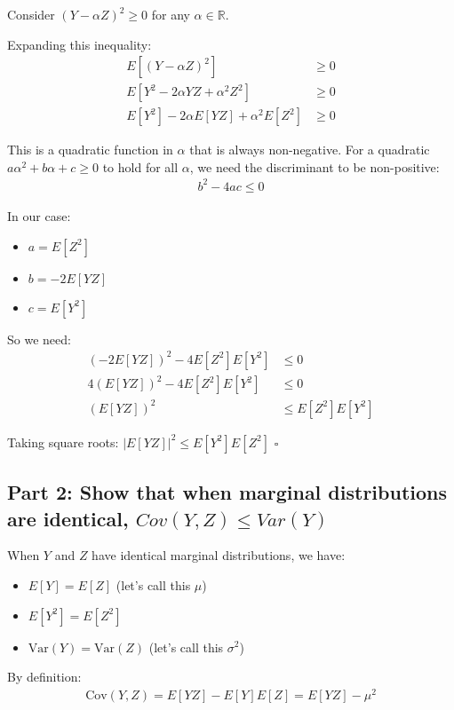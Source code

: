 \documentclass[11pt,a4paper]{article}
\begin{document}
Consider $(Y - \alpha Z)^2 \geq 0$ for any $\alpha \in \mathbb{R}$.

Expanding this inequality:
\begin{align}
E[(Y - \alpha Z)^2] &\geq 0\\
E[Y^2 - 2\alpha YZ + \alpha^2 Z^2] &\geq 0\\
E[Y^2] - 2\alpha E[YZ] + \alpha^2 E[Z^2] &\geq 0
\end{align}

This is a quadratic function in $\alpha$ that is always non-negative. For a quadratic $a\alpha^2 + b\alpha + c \geq 0$ to hold for all $\alpha$, we need the discriminant to be non-positive:
\begin{align}
b^2 - 4ac \leq 0
\end{align}

In our case:
\begin{itemize}
\item $a = E[Z^2]$
\item $b = -2E[YZ]$ 
\item $c = E[Y^2]$
\end{itemize}

So we need:
\begin{align}
(-2E[YZ])^2 - 4E[Z^2]E[Y^2] &\leq 0\\
4(E[YZ])^2 - 4E[Z^2]E[Y^2] &\leq 0\\
(E[YZ])^2 &\leq E[Z^2]E[Y^2]
\end{align}

Taking square roots: $|E[YZ]|^2 \leq E[Y^2]E[Z^2]$ $\square$

\subsection{Part 2: Show that when marginal distributions are identical, $Cov(Y,Z) \leq Var(Y)$}

When $Y$ and $Z$ have identical marginal distributions, we have:
\begin{itemize}
\item $E[Y] = E[Z]$ (let's call this $\mu$)
\item $E[Y^2] = E[Z^2]$ 
\item $\text{Var}(Y) = \text{Var}(Z)$ (let's call this $\sigma^2$)
\end{itemize}

By definition:
\begin{align}
\text{Cov}(Y,Z) = E[YZ] - E[Y]E[Z] = E[YZ] - \mu^2
\end{align}
\end{document}
